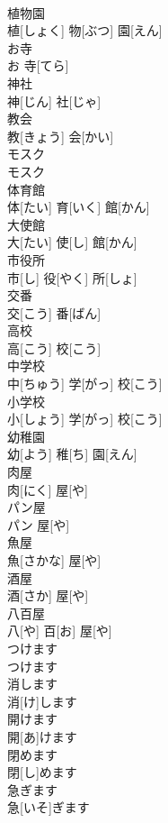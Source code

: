 \documentclass[8pt]{extreport}
\begin{document}
\begin{CJK}{UTF8}{min}
\\	植物園	
\\	植[しょく] 物[ぶつ] 園[えん]		
\\	お寺	
\\	お 寺[てら]		
\\	神社	
\\	神[じん] 社[じゃ]		
\\	教会	
\\	教[きょう] 会[かい]		
\\	モスク	
\\	モスク		
\\	体育館	
\\	体[たい] 育[いく] 館[かん]		
\\	大使館	
\\	大[たい] 使[し] 館[かん]		
\\	市役所	
\\	市[し] 役[やく] 所[しょ]		
\\	交番	
\\	交[こう] 番[ばん]		
\\	高校	
\\	高[こう] 校[こう]		
\\	中学校	
\\	中[ちゅう] 学[がっ] 校[こう]		
\\	小学校	
\\	小[しょう] 学[がっ] 校[こう]		
\\	幼稚園	
\\	幼[よう] 稚[ち] 園[えん]		
\\	肉屋	
\\	肉[にく] 屋[や]		
\\	パン屋	
\\	パン 屋[や]		
\\	魚屋	
\\	魚[さかな] 屋[や]		
\\	酒屋	
\\	酒[さか] 屋[や]		
\\	八百屋	
\\	八[や] 百[お] 屋[や]		
\\	つけます	
\\	つけます		
\\	消します	
\\	消[け]します		
\\	開けます	
\\	開[あ]けます		
\\	閉めます	
\\	閉[し]めます		
\\	急ぎます	
\\	急[いそ]ぎます		

\end{CJK}
\end{document}
